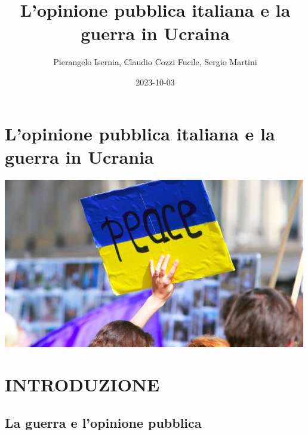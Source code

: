 \documentclass[
  openany]{book}
\title{L'opinione pubblica italiana e la guerra in Ucraina}
\author{Pierangelo Isernia, Claudio Cozzi Fucile, Sergio Martini}
\date{2023-10-03}
\begin{document}
\maketitle

{
\setcounter{tocdepth}{1}
\tableofcontents
}
\hypertarget{lopinione-pubblica-italiana-e-la-guerra-in-ucrania}{%
\chapter*{L'opinione pubblica italiana e la guerra in Ucrania}\label{lopinione-pubblica-italiana-e-la-guerra-in-ucrania}}

\includegraphics{Images/Ucrania.jpeg}

\hypertarget{introduzione}{%
\chapter{INTRODUZIONE}\label{introduzione}}

\hypertarget{la-guerra-e-lopinione-pubblica}{%
\section{La guerra e l'opinione pubblica}\label{la-guerra-e-lopinione-pubblica}}
\end{document}
